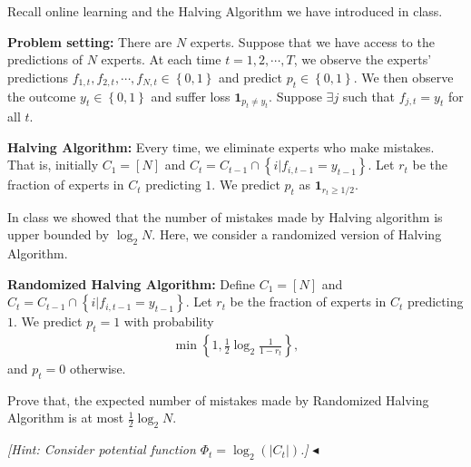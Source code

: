 \documentclass[11pt]{article}
\newenvironment{problem}[2][Problem]{\begin{trivlist}
\item[\hskip \labelsep {\bfseries #1}\hskip \labelsep {\bfseries #2.}]}{\hfill$\blacktriangleleft$\end{trivlist}}
\begin{document}
\begin{problem}{7 (18')} Recall online learning and the Halving Algorithm we have introduced in class.

\textbf{Problem setting:} There are $N$ experts. Suppose that we have access to the predictions of $N$ experts. At each time $t=1,2,\cdots,T$, we observe the experts' predictions $f_{1,t},f_{2,t},\cdots,f_{N,t}\in\left\{0,1\right\}$ and predict $p_t\in\left\{0,1\right\}$. We then observe the outcome $y_t\in\left\{0,1\right\}$ and suffer loss $\mathbf{1}_{p_t\neq y_t}$. Suppose $\exists j$ such that $f_{j,t}=y_t$ for all $t$.

\textbf{Halving Algorithm:} Every time, we eliminate experts who make mistakes. That is, initially $C_1=[N]$ and $C_t=C_{t-1}\cap\left\{i|f_{i,t-1}=y_{t-1}\right\}$. Let $r_t$ be the fraction of experts in $C_t$ predicting $1$. We predict $p_t$ as $\mathbf{1}_{r_t\geq 1/2}$.

In class we showed that the number of mistakes made by Halving algorithm is upper bounded by $\log_2 N$. Here, we consider a randomized version of Halving Algorithm.

\textbf{Randomized Halving Algorithm:} Define $C_1=[N]$ and $C_t=C_{t-1}\cap\left\{i|f_{i,t-1}=y_{t-1}\right\}$. Let $r_t$ be the fraction of experts in $C_t$ predicting $1$. We predict $p_t=1$ with probability
\begin{align*}
    \min\left\{1,\frac{1}{2}\log_2\frac{1}{1-r_t}\right\},
\end{align*}
and $p_t=0$ otherwise.

Prove that, the expected number of mistakes made by Randomized Halving Algorithm is at most $\frac{1}{2}\log_2 N$.

\textit{[Hint: Consider potential function $\Phi_t=\log_2(|C_t|)$.]}
\end{problem}
\end{document}
